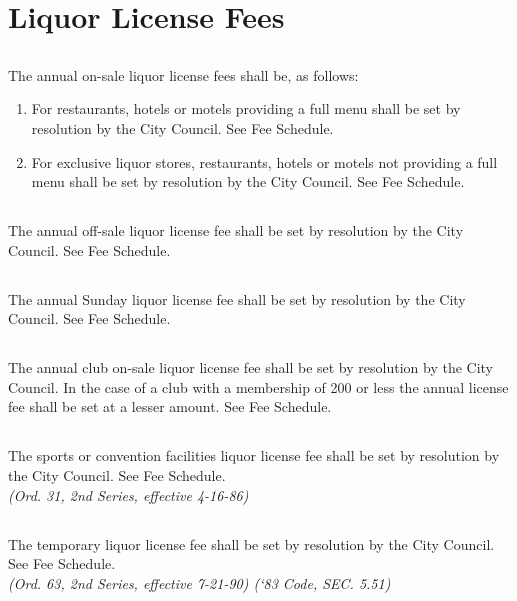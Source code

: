 \section{Liquor License Fees}
\subsection{}
The annual on-sale liquor license fees shall be, as follows:
\begin{enumerate}[{\indent}1)]
    \item For restaurants, hotels or motels providing a full menu shall be set by resolution by the City Council. See Fee Schedule.
    \item For exclusive liquor stores, restaurants, hotels or motels not providing a full menu shall be set by resolution by the City Council. See Fee Schedule.
\end{enumerate}
\subsection{}
The annual off-sale liquor license fee shall be set by resolution by the City Council. See Fee Schedule.
\subsection{}
The annual Sunday liquor license fee shall be set by resolution by the City Council. See Fee Schedule.
\subsection{}
The annual club on-sale liquor license fee shall be set by resolution by the City Council. In the case of a club with a membership of 200 or less the annual license fee shall be set at a lesser amount. See Fee Schedule.
\subsection{}
The sports or convention facilities liquor license fee shall be set by resolution by the City Council. See Fee Schedule.\\
\emph{(Ord. 31, 2nd Series, effective 4-16-86)}
\subsection{}
The temporary liquor license fee shall be set by resolution by the City Council. See Fee Schedule.\\
\emph{(Ord. 63, 2nd Series, effective 7-21-90) (‘83 Code, SEC. 5.51)}
